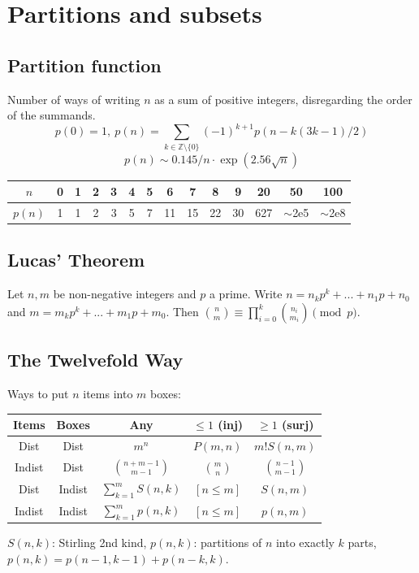 \section{Partitions and subsets}
	\subsection{Partition function}
		Number of ways of writing $n$ as a sum of positive integers, disregarding the order of the summands.
		\[ p(0) = 1,\ p(n) = \sum_{k \in \mathbb Z \setminus \{0\}}{(-1)^{k+1} p(n - k(3k-1) / 2)} \]
		\[ p(n) \sim 0.145 / n \cdot \exp(2.56 \sqrt{n}) \]

		\begin{center}
		\begin{tabular}{c|c@{\ }c@{\ }c@{\ }c@{\ }c@{\ }c@{\ }c@{\ }c@{\ }c@{\ }c@{\ }c@{\ }c@{\ }c}
			$n$    & 0 & 1 & 2 & 3 & 4 & 5 & 6  & 7  & 8  & 9  & 20  & 50  & 100 \\ \hline
			$p(n)$ & 1 & 1 & 2 & 3 & 5 & 7 & 11 & 15 & 22 & 30 & 627 & $\mathtt{\sim}$2e5 & $\mathtt{\sim}$2e8 \\
		\end{tabular}
		\end{center}

	\subsection{Lucas' Theorem}
		Let $n,m$ be non-negative integers and $p$ a prime. Write $n=n_kp^k+...+n_1p+n_0$ and $m=m_kp^k+...+m_1p+m_0$. Then $\binom{n}{m} \equiv \prod_{i=0}^k\binom{n_i}{m_i} \pmod{p}$.
	
	\subsection{The Twelvefold Way}
        Ways to put $n$ items into $m$ boxes:
        \begin{center}
        \small
        \begin{tabular}{c|c||c|c|c}
        Items & Boxes & Any & $\le 1$ (inj) & $\ge 1$ (surj) \\ \hline
        Dist & Dist & $m^n$ & $P(m,n)$ & $m! S(n,m)$ \\
        Indist & Dist & $\binom{n+m-1}{m-1}$ & $\binom{m}{n}$ & $\binom{n-1}{m-1}$ \\
        Dist & Indist & $\sum_{k=1}^m S(n,k)$ & $[n \le m]$ & $S(n,m)$ \\
        Indist & Indist & $\sum_{k=1}^m p(n,k)$ & $[n \le m]$ & $p(n,m)$ \\
        \end{tabular}
        \normalsize
        \end{center}
        $S(n,k)$: Stirling 2nd kind, $p(n,k)$: partitions of $n$ into exactly $k$ parts, $p(n,k) = p(n-1,k-1) + p(n-k,k)$.
	
